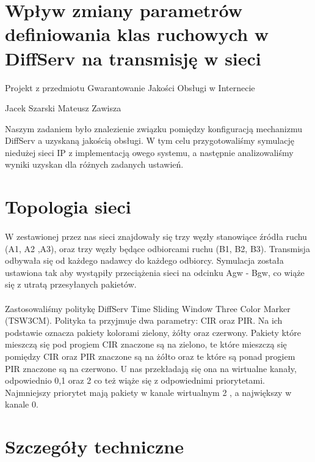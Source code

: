 \documentclass[a4paper]{article}
\begin{document}
\section{Wpływ zmiany parametrów definiowania klas ruchowych w DiffServ na transmisję w sieci}

Projekt z przedmiotu Gwarantowanie Jakości Obsługi w Internecie

Jacek Szarski
Mateusz Zawisza


Naszym zadaniem było znalezienie związku pomiędzy konfiguracją mechanizmu DiffServ a uzyskaną jakością obsługi. W tym celu przygotowaliśmy symulację niedużej sieci IP z implementacją owego systemu, a następnie analizowaliśmy wyniki uzyskan dla różnych zadanych ustawień.


\section{Topologia sieci}


\paragraph{}
W zestawionej przez nas sieci znajdowały się trzy węzły stanowiące źródła ruchu (A1, A2 ,A3), oraz trzy węzły będące odbiorcami ruchu (B1, B2, B3). Transmisja odbywała się od każdego nadawcy do każdego odbiorcy. Symulacja została ustawiona tak aby wystąpiły przeciążenia sieci na odcinku Agw - Bgw, co wiąże się z utratą przesyłanych pakietów.

\paragraph{}
Zastosowaliśmy politykę DiffServ Time Sliding Window Three Color Marker (TSW3CM).
Polityka ta przyjmuje dwa parametry: CIR oraz PIR. Na ich podstawie oznacza pakiety kolorami zielony, żółty oraz czerwony. Pakiety które mieszczą się pod progiem CIR znaczone są na zielono, te które mieszczą się pomiędzy CIR oraz PIR znaczone są na żółto oraz te które są ponad progiem PIR znaczone są na czerwono. U nas przekładają się ona na wirtualne kanały, odpowiednio 0,1 oraz 2 co też wiąże się z odpowiednimi priorytetami. Najmniejszy priorytet mają pakiety w kanale wirtualnym 2 , a największy w kanale 0.


\section{Szczegóły techniczne}
\end{document}
